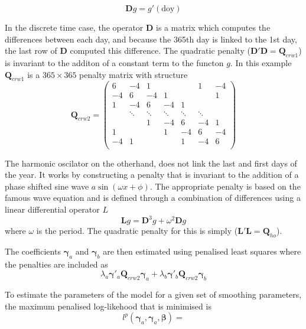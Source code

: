 \begin{equation}
  \bm{D}g = g'(\text{doy})
\end{equation}

In the discrete time case, the operator $\bm{D}$ is a matrix which computes the differences between each day, and because the 365th day is linked to the 1st day, the last row of $\bm{D}$ computed this difference. The quadratic penalty ($\bm{D}'\bm{D}=\bm{Q}_{crw1}$) is invariant to the additon of a constant term to the functon $g$. In this example $\bm{Q}_{crw1}$ is a $365 \times 365$ penalty matrix with structure
\begin{equation}
\bm{Q}_{crw2} = 
\begin{pmatrix} 
6 & -4 & 1 &  &  & 1 & -4 \\ 
-4 & 6 & -4 & 1 &  &  & 1 \\ 
1 & -4 & 6 & -4 & 1 &  &  \\ 
 & \ddots & \ddots & \ddots & \ddots & \ddots &  \\ 
 &  & 1 & -4 & 6 & -4 & 1 \\ 
1 &  &  & 1 & -4 & 6 & -4 \\ 
-4 & 1 &  &  & 1 & -4 & 6 \\ 
\end{pmatrix}
\end{equation}


The harmonic oscilator on the otherhand, does not link the last and first days of the year.  It works by constructing a penalty that is invariant to the addition of a phase shifted sine wave $a \sin(\omega x + \phi)$.  The appropriate penalty is based on the famous wave equation and is defined through a combination of differences using a linear differential operator $L$
\begin{equation}
  \bm{L}g = \bm{D}^{3}g + \omega^2\bm{D}g
\end{equation}
where $\omega$ is the period. The quadratic penalty for this is simply ($\bm{L}'\bm{L}=\bm{Q}_{ho}$).

The coefficients $\bm{\gamma}_a$ and $\bm{\gamma}_b$ are then estimated using penalised least squares where the penalties are included as 
\begin{equation}
  \lambda_a \bm{\gamma}'_a \bm{Q}_{crw2} \bm{\gamma}_a + \lambda_b \bm{\gamma}'_b \bm{Q}_{crw2} \bm{\gamma}_b
\end{equation}

To estimate the parameters of the model for a given set of smoothing parameters, the maximum penalised log-likehood that is minimised is
\begin{equation}
  l^p(\bm{\gamma}_a, \bm{\gamma}_a, \bm{\beta}) = 
\end{equation}

